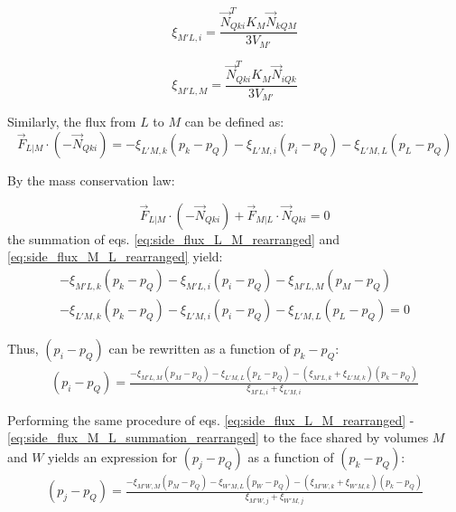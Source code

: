 \documentclass{article}
\begin{document}
\begin{displaymath}
	\xi_{M'L,i} = \frac{\vec{N}^{T}_{Qki} K_{M} \vec{N}_{kQM}}{3V_{M'}}
\end{displaymath}

\begin{displaymath}
	\xi_{M'L,M} = \frac{\vec{N}^{T}_{Qki} K_{M} \vec{N}_{iQk}}{3V_{M'}}
\end{displaymath}

Similarly, the flux from $L$ to $M$ can be defined as:
\begin{equation} \label{eq:side_flux_L_M_rearranged}
\vec{F}_{L|M} \cdot (-\vec{N}_{Qki}) = -\xi_{L'M,k}(p_{k} - p_{Q}) - \xi_{L'M,i}(p_{i} - p_{Q}) - \xi_{L'M,L}(p_{L} - p_{Q})
\end{equation}

By the mass conservation law:

\begin{equation} \label{eq:side_flux_L_M_summation}
\vec{F}_{L|M} \cdot (-\vec{N}_{Qki}) + \vec{F}_{M|L} \cdot \vec{N}_{Qki}= 0
\end{equation}
the summation of eqs. \ref{eq:side_flux_L_M_rearranged} and \ref{eq:side_flux_M_L_rearranged} yield:
\begin{equation} \label{eq:side_flux_M_L_summation_rearranged}
\begin{split}
-\xi_{M'L,k}(p_{k} - p_{Q}) - \xi_{M'L,i}(p_{i} - p_{Q}) - \xi_{M'L,M}(p_{M} - p_{Q}) \\ - \xi_{L'M,k}(p_{k} - p_{Q}) - \xi_{L'M,i}(p_{i} - p_{Q}) - \xi_{L'M,L}(p_{L} - p_{Q}) = 0
\end{split}
\end{equation}

Thus, $ (p_{i} - p_{Q}) $ can be rewritten as a function of $ p_{k} - p_{Q} $:
\begin{equation} \label{eq:pi_minus_pq}
\begin{split}
(p_{i} - p_{Q}) = \frac{- \xi_{M'L,M}(p_{M} - p_{Q})
						- \xi_{L'M,L}(p_{L} - p_{Q})
						- (\xi_{M'L,k} + \xi_{L'M,k})(p_{k} - p_{Q})
}{\xi_{M'L,i} + \xi_{L'M,i}}
\end{split}
\end{equation}

Performing the same procedure of eqs. \ref{eq:side_flux_L_M_rearranged} - \ref{eq:side_flux_M_L_summation_rearranged} to the face shared by volumes $ M $ and $ W $ yields an expression for $ (p_{j} - p_{Q}) $ as a function of $ (p_{k} - p_{Q}) $:
\begin{equation} \label{eq:pj_minus_pq}
\begin{split}
(p_{j} - p_{Q}) = \frac{- \xi_{M'W,M}(p_{M} - p_{Q})
						- \xi_{W'M,L}(p_{W} - p_{Q})
						- (\xi_{M'W,k} + \xi_{W'M,k})(p_{k} - p_{Q})
}{\xi_{M'W,j} + \xi_{W'M,j}}
\end{split}
\end{equation}
\end{document}
